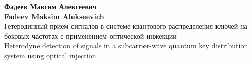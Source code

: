 \thispagestyle{empty}


\vspace{0pt plus2fill} %

\vspace*{250pt}
\begin{center}
{\large  
\textbf{Фадеев Максим Алексеевич}}\\
{\large 
\textbf{Fadeev Maksim Alekseevich}}\\
\textbf {\large %
} Гетеродинный прием сигналов в системе квантового распределения ключей на боковых частотах с применением оптической инжекции\\
\textbf {\large %
} Heterodyne detection of signals in a subcarrier-wave quantum key distribution system using optical injection
\end{center}

\vspace{0pt plus2fill} %




